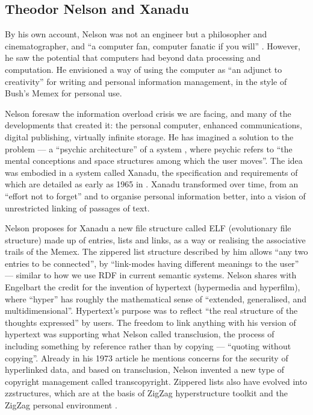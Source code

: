 \subsection{Theodor Nelson and Xanadu}
\label{sub:nelson}

By his own account, Nelson was not an engineer but a philosopher and cinematographer, and ``a computer fan, computer fanatic if you will'' \cite{Nelson1974}. However, he saw the potential that computers had beyond data processing and computation. He envisioned a way of using the computer as ``an adjunct to creativity'' for writing and personal information management, in the style of Bush's Memex for personal use. 

Nelson foresaw the information overload crisis we are facing, and many of the developments that created it: the personal computer, enhanced communications, digital publishing, virtually infinite storage. He has imagined a solution to the problem ---  a ``psychic architecture'' of a system \cite{Nelson1973}, where psychic refers to ``the mental conceptions and space structures among which the user moves''. 
The idea was embodied in a system called Xanadu, the specification and requirements of which are detailed as early as 1965 in \cite{Nelson1965}. Xanadu transformed over time, from an ``effort not to forget'' and to organise personal information better, into a vision of unrestricted linking of passages of text.

Nelson proposes for Xanadu a new file structure called ELF (evolutionary file structure) made up of entries, lists and links, as a way or realising the associative trails of the Memex. The zippered list structure described by him allows ``any two entries to be connected'', by ``link-modes having different meanings to the user'' --- similar to how we use RDF in current semantic systems. 
Nelson shares with Engelbart the credit for the invention of hypertext (hypermedia and hyperfilm), where ``hyper'' has roughly the mathematical sense of ``extended, generalised, and multidimensional''. Hypertext's purpose was to reflect ``the real structure of the thoughts expressed'' by users.
The freedom to link anything with his version of hypertext was supporting what Nelson called transclusion, the process of including something by reference rather than by copying --- ``quoting without copying''. Already in his 1973 article \cite{Nelson1973} he mentions concerns for the security  of hyperlinked data, and based on transclusion, Nelson invented a new type of copyright management called transcopyright.
Zippered lists also have evolved into zzstructures, which are at the basis of ZigZag hyperstructure toolkit and the ZigZag personal environment \cite{Nelson2004}.

